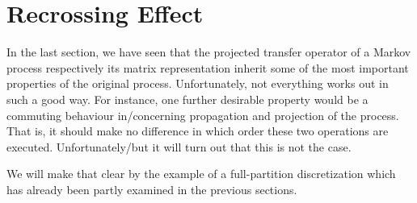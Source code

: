 \section{Recrossing Effect}
\label{sec:recrossing}

In the last section, we have seen that the projected transfer operator of a Markov process respectively its matrix representation inherit some of the most important properties of the original process.
Unfortunately, not everything works out in such a good way.
For instance, one further desirable property would be a commuting behaviour in/concerning propagation and projection of the process. That is, it should make no difference in which order these two operations are executed.
Unfortunately/but it will turn out that this is not the case.

We will make that clear by the example of a full-partition discretization which has already been partly examined in the previous sections.




